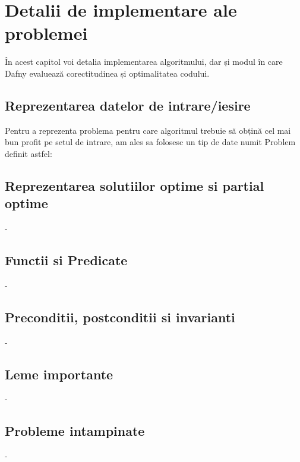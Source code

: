 \chapter{Detalii de implementare ale problemei}

În acest capitol voi detalia implementarea algoritmului, dar și modul în care Dafny evaluează corectitudinea și optimalitatea codului. 

\section{Reprezentarea datelor de intrare/iesire}

Pentru a reprezenta problema pentru care algoritmul trebuie să obțină cel mai bun profit pe setul de intrare, am ales sa folosesc un tip de date numit Problem definit astfel:

\section{Reprezentarea solutiilor optime si partial optime}

-

\section{Functii si Predicate}

-

\section{Preconditii, postconditii si invarianti}

-

\section{Leme importante}

-

\section{Probleme intampinate}

-